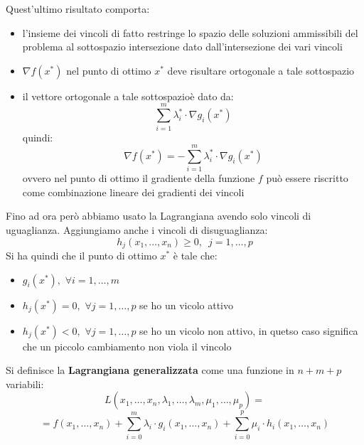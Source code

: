 \message{ !name(ro.tex)}\documentclass[a4paper,12pt, oneside]{book}
\begin{document}
Quest'ultimo risultato comporta:
\begin{itemize}
  \item l'insieme dei vincoli di fatto restringe lo spazio delle
  soluzioni ammissibili del problema al sottospazio intersezione
  dato dall’intersezione dei vari vincoli
  \item $\nabla f(x^*)$ nel punto di ottimo $x^*$ deve risultare
  ortogonale a tale sottospazio
  \item il vettore ortogonale a tale sottospazioè dato da:
  \[\sum_{i=1}^m\lambda_i^*\cdot \nabla g_i(x^*)\]
  quindi:
  \[\nabla f(x^*)=-\sum_{i=1}^m\lambda_i^*\cdot \nabla g_i(x^*)\]
  ovvero  nel punto di ottimo il gradiente della funzione $f$ può
  essere riscritto come combinazione lineare dei gradienti dei vincoli 
\end{itemize}
Fino ad ora però abbiamo usato la Lagrangiana avendo solo vincoli di
uguaglianza. Aggiungiamo anche i vincoli di disuguaglianza:
\[h_j(x_1,\ldots,x_n)\geq 0,\,\,\,j=1,\ldots,p\]
Si ha quindi che il punto di ottimo $x^*$ è tale che:
\begin{itemize}
  \item $g_i(x^*),\,\,\forall i=1,\ldots,m$
  \item $h_j(x^*)=0,\,\,\forall j=1,\ldots,p$ se ho un vicolo attivo
  \item $h_j(x^*)<0,\,\,\forall j=1,\ldots,p$ se ho un vicolo non
  attivo, in quetso caso significa che un piccolo cambiamento non viola
  il vincolo 
\end{itemize}
Si definisce la \textbf{Lagrangiana generalizzata} come una funzione
in $n+m+p$ variabili:
\[L(x_1,\ldots,x_n,\lambda_1,\ldots,\lambda_m,\mu_1,\ldots,\mu_p)=\]
\[=f(x_1,\ldots,x_n)+ \sum_{i=0}^m\lambda_i\cdot g_i(x_1,\ldots,x_n)+
  \sum_{i=0}^p\mu_i\cdot h_i(x_1,\ldots,x_n)\]
\end{document}
